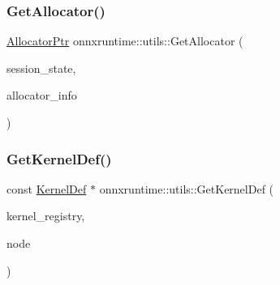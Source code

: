 \mbox{\label{namespaceonnxruntime_1_1utils_a1929d3a08af5b86f2040d95ea0f7a7ce}} 
\subsubsection{\texorpdfstring{Get\+Allocator()}{GetAllocator()}\hspace{0.1cm}{\footnotesize\ttfamily [2/2]}}
{\footnotesize\ttfamily \mbox{\hyperlink{namespaceonnxruntime_a6cdac724c5dcefded3a63f08dae58fda}{Allocator\+Ptr}} onnxruntime\+::utils\+::\+Get\+Allocator (\begin{DoxyParamCaption}\item[{const \mbox{\hyperlink{classonnxruntime_1_1SessionState}{Session\+State}} \&}]{session\+\_\+state,  }\item[{const \mbox{\hyperlink{structONNXRuntimeAllocatorInfo}{O\+N\+N\+X\+Runtime\+Allocator\+Info}} \&}]{allocator\+\_\+info }\end{DoxyParamCaption})}

\mbox{\label{namespaceonnxruntime_1_1utils_a7cc8827cc590f48e3cc3ef8eaa6c4f56}} 
\subsubsection{\texorpdfstring{Get\+Kernel\+Def()}{GetKernelDef()}\hspace{0.1cm}{\footnotesize\ttfamily [1/2]}}
{\footnotesize\ttfamily const \mbox{\hyperlink{classonnxruntime_1_1KernelDef}{Kernel\+Def}} $\ast$ onnxruntime\+::utils\+::\+Get\+Kernel\+Def (\begin{DoxyParamCaption}\item[{const \mbox{\hyperlink{classonnxruntime_1_1KernelRegistryManager}{Kernel\+Registry\+Manager}} \&}]{kernel\+\_\+registry,  }\item[{const \mbox{\hyperlink{classonnxruntime_1_1Node}{onnxruntime\+::\+Node}} \&}]{node }\end{DoxyParamCaption})}

\mbox{\label{namespaceonnxruntime_1_1utils_a7588af1ad0ff65f7922537f1e8b76ee6}} 
